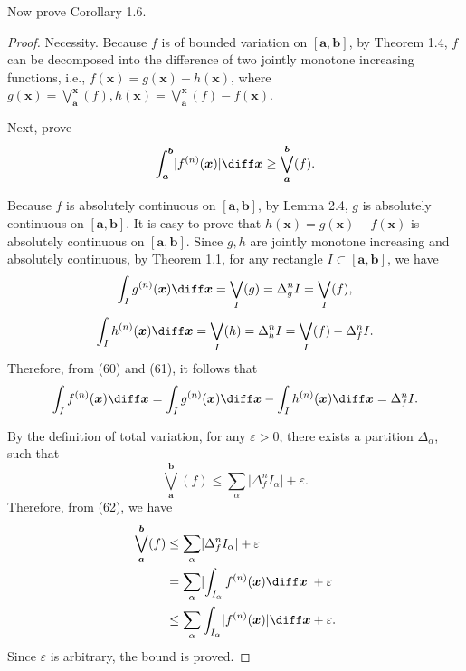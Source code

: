 \documentclass{ijclclp}
\begin{document}
Now prove Corollary 1.6.
\begin{proof}
    Necessity. Because \(f\) is of bounded variation on \([\boldsymbol{a},\boldsymbol{b}]\), by Theorem 1.4, \(f\) can be decomposed into the difference of two jointly monotone increasing functions, i.e., \(f(\boldsymbol{x})=g(\boldsymbol{x})-h(\boldsymbol{x})\), where \(g(\boldsymbol{x})=\bigvee\limits_{\boldsymbol{a}}^{\boldsymbol{x}}(f),h(\boldsymbol{x})=\bigvee\limits_{\boldsymbol{a}}^{\boldsymbol{x}}(f)-f(\boldsymbol{x})\).
    
    Next, prove
    \begin{equation}
        \int_{\boldsymbol{a}}^{\boldsymbol{b}}\lvert f^{(n)}(\boldsymbol{x})\rvert\diff\boldsymbol{x}\geq\bigvee_{\boldsymbol{a}}^{\boldsymbol{b}}(f).
    \end{equation}
    
    Because \(f\) is absolutely continuous on \([\boldsymbol{a},\boldsymbol{b}]\), by Lemma 2.4, \(g\) is absolutely continuous on \([\boldsymbol{a},\boldsymbol{b}]\). 
    It is easy to prove that \(h(\boldsymbol{x})=g(\boldsymbol{x})-f(\boldsymbol{x})\) is absolutely continuous on \([\boldsymbol{a},\boldsymbol{b}]\). 
    Since \(g,h\) are jointly monotone increasing and absolutely continuous, by Theorem 1.1, for any rectangle \(I\subset[\boldsymbol{a},\boldsymbol{b}]\), we have
    \begin{equation}
        \int_Ig^{(n)}(\boldsymbol{x})\diff\boldsymbol{x}=\bigvee_I(g)=\Delta_g^nI=\bigvee_I(f),
    \end{equation}
    \begin{equation}
        \int_Ih^{(n)}(\boldsymbol{x})\diff\boldsymbol{x}=\bigvee_I(h)=\Delta_h^nI=\bigvee_I(f)-\Delta_f^nI.
    \end{equation}
    Therefore, from (60) and (61), it follows that
    \begin{equation}
         \int_If^{(n)}(\boldsymbol{x})\diff\boldsymbol{x}=\int_Ig^{(n)}(\boldsymbol{x})\diff\boldsymbol{x}-\int_Ih^{(n)}(\boldsymbol{x})\diff\boldsymbol{x}=\Delta_f^nI.  
    \end{equation}
    
    By the definition of total variation, for any \(\varepsilon>0\), there exists a partition \(\Delta_\alpha\), such that
    \begin{equation}
        \bigvee_{\boldsymbol{a}}^{\boldsymbol{b}}(f)\leq\sum_\alpha\lvert \Delta_f^nI_\alpha\rvert+\varepsilon.
    \end{equation}
    Therefore, from (62), we have
    \begin{align*}
        \bigvee_{\boldsymbol{a}}^{\boldsymbol{b}}(f)&\leq\sum_\alpha\lvert \Delta_f^nI_\alpha\rvert+\varepsilon\\
        &=\sum_\alpha\lvert \int_{I_\alpha}f^{(n)}(\boldsymbol{x})\diff\boldsymbol{x}\rvert+\varepsilon\\
        &\leq\sum_\alpha\int_{I_\alpha}\lvert f^{(n)}(\boldsymbol{x})\rvert\diff\boldsymbol{x}+\varepsilon.
    \end{align*}
    Since \(\varepsilon\) is arbitrary, the bound is proved.


\end{proof}
\end{document}
